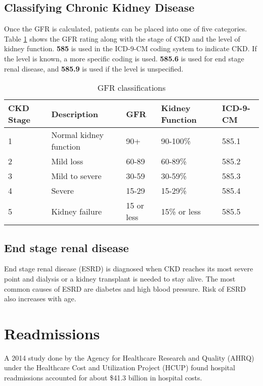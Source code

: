 \documentclass[12pt]{ociamthesis}\usepackage[]{graphicx}\usepackage[]{color}
\begin{document}
\subsection{Classifying Chronic Kidney Disease}

Once the GFR is calculated, patients can be placed into one of five categories. Table \ref{tab:gfr} shows the 
GFR rating along with the stage of CKD and the level of kidney function. \textbf{585} is used in the ICD-9-CM coding system
to indicate CKD. If the level is known, a more specific coding is used. \textbf{585.6} is used for end stage renal disease,
and \textbf{585.9} is used if the level is unspecified.

\begin{table}[]
\centering
\label{my-label}
\begin{tabular}{lllll}
CKD Stage & Description             & GFR        & Kidney Function & ICD-9-CM \\
\hline
1         & Normal kidney function  & 90+        & 90-100\%        & 585.1    \\
2         & Mild loss               & 60-89      & 60-89\%         & 585.2    \\
3         & Mild to severe          & 30-59      & 30-59\%         & 585.3    \\
4         & Severe                  & 15-29      & 15-29\%         & 585.4    \\
5         & Kidney failure          & 15 or less & 15\% or less    & 585.5    \\
\end{tabular}\caption{GFR classifications}\label{tab:gfr}
\end{table}

\subsection{End stage renal disease}

End stage renal disease (ESRD) is diagnosed when CKD reaches its most severe point and dialysis or a kidney transplant is needed to stay alive.
The most common causes of ESRD are diabetes and high blood pressure. Risk of ESRD also increases with age.


\section{Readmissions}

A 2014 study done by the Agency for Healthcare Research and Quality (AHRQ) under the Healthcare Cost and Utilization
Project (HCUP) found hospital readmissions accounted for about \$41.3 billion in hospital costs.  \cite{Hines2014}
\end{document}
